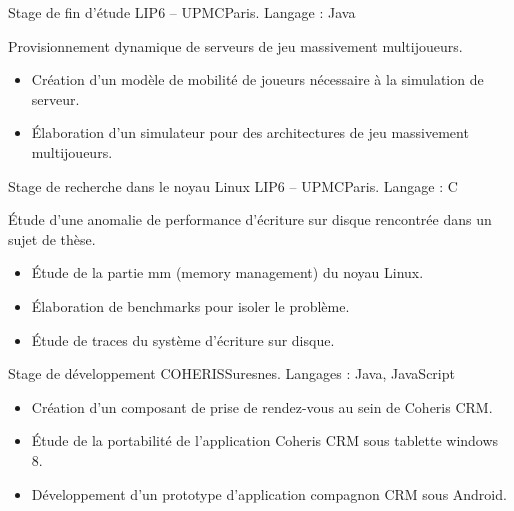 \documentclass[11pt,a4paper,sans]{moderncv}
\begin{document}
\vspace{1em}

        {Stage de fin d'étude}
        {LIP6 -- UPMC}{Paris. Langage : Java}{}
        {
            Provisionnement dynamique de serveurs de jeu massivement multijoueurs.
            \begin{itemize}
                \item Création d'un modèle de mobilité de joueurs nécessaire à la simulation de serveur.
                \item\'Elaboration d'un simulateur pour des architectures de jeu massivement multijoueurs.
            \end{itemize}
        }

\vspace{1em}

        {Stage de recherche dans le noyau Linux}
        {LIP6 -- UPMC}{Paris. Langage : C}{}
        {
            \'Etude d'une anomalie de performance d'écriture sur disque rencontrée dans un sujet de thèse.
            \begin{itemize}
                \item\'Etude de la partie mm (memory management) du noyau Linux.
                \item\'Elaboration de benchmarks pour isoler le problème.
                \item\'Etude de traces du système d'écriture sur disque.
            \end{itemize}
        }

\vspace{1em}

        {Stage de développement}
        {COHERIS}{Suresnes. Langages : Java, JavaScript}{}
        {
            \begin{itemize}
                \item Création d'un composant de prise de rendez-vous au sein de Coheris CRM.
                \item\'Etude de la portabilité de l'application Coheris CRM sous tablette windows 8.
                \item Développement d'un prototype d'application compagnon CRM sous Android.
            \end{itemize}
        }

\vspace{0.5em}

\end{document}
